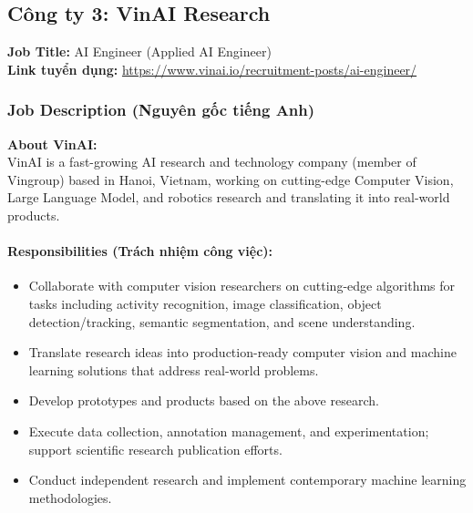 \subsection{Công ty 3: VinAI Research}

\noindent\textbf{Job Title:} AI Engineer (Applied AI Engineer) \\
\textbf{Link tuyển dụng:} \url{https://www.vinai.io/recruitment-posts/ai-engineer/}

\subsubsection*{Job Description (Nguyên gốc tiếng Anh)}

\textbf{About VinAI:} \\
\indent VinAI is a fast-growing AI research and technology company (member of Vingroup) based in Hanoi, Vietnam, working on cutting-edge Computer Vision, Large Language Model, and robotics research and translating it into real-world products.

\paragraph{Responsibilities (Trách nhiệm công việc):}
\begin{itemize}
    \item Collaborate with computer vision researchers on cutting-edge algorithms for tasks including activity recognition, image classification, object detection/tracking, semantic segmentation, and scene understanding.
    \item Translate research ideas into production-ready computer vision and machine learning solutions that address real-world problems.
    \item Develop prototypes and products based on the above research.
    \item Execute data collection, annotation management, and experimentation; support scientific research publication efforts.
    \item Conduct independent research and implement contemporary machine learning methodologies.
\end{itemize}

